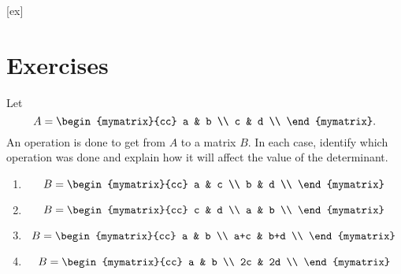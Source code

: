 [ex]
\section*{Exercises}

\begin{enumialphparenastyle}

\begin{ex}
  Let 
  \begin{equation*}
    A = \begin{mymatrix}{cc}
      a & b \\
      c & d \\
    \end{mymatrix}.
  \end{equation*}
  An operation is done to get from $A$ to a matrix $B$. In each case,
  identify which operation was done and explain how it will affect the
  value of the determinant.
  \begin{enumerate}
  \item
    \begin{equation*}
      B = \begin{mymatrix}{cc}
        a & c \\
        b & d \\
      \end{mymatrix}
    \end{equation*}
  \item
    \begin{equation*}
      B = \begin{mymatrix}{cc}
        c & d \\
        a & b \\
      \end{mymatrix}
    \end{equation*}
  \item
    \begin{equation*}
      B = \begin{mymatrix}{cc}
        a   & b   \\
        a+c & b+d \\
      \end{mymatrix}
    \end{equation*}
  \item
    \begin{equation*}
      B = \begin{mymatrix}{cc}
        a  & b  \\
        2c & 2d \\
      \end{mymatrix}

\end{equation*}
\end{enumerate}
\end{ex}
\end{enumialphparenastyle}
